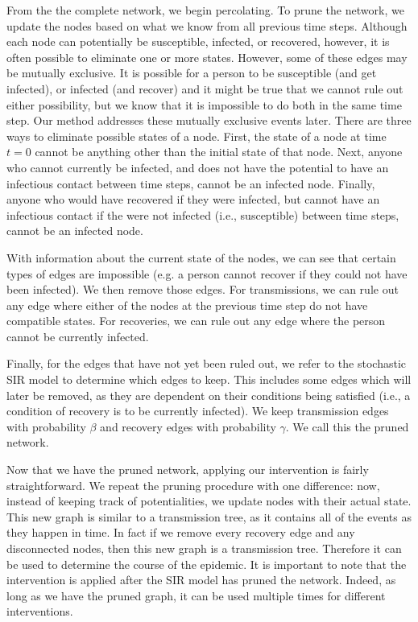 \documentclass[PTRSB]{rsos}
\begin{document}
From the the complete network, we begin percolating. 
To prune the network, we update the nodes based on what we know from all previous time steps.
Although each node can potentially be susceptible, infected, or recovered, however, it is often possible to eliminate one or more states.
However, some of these edges may be mutually exclusive.
It is possible for a person to be susceptible (and get infected), or infected (and recover) and it might be true that we cannot rule out either possibility, but we know that it is impossible to do both in the same time step.
Our method addresses these mutually exclusive events later. %
There are three ways to eliminate possible states of a node.
First, the state of a node at time $t=0$ cannot be anything other than the initial state of that node.
Next, anyone who cannot currently be infected, and does not have the potential to have an infectious contact between time steps, cannot be an infected node.
Finally, anyone who would have recovered if they were infected, but cannot have an infectious contact if the were not infected (i.e., susceptible) between time steps, cannot be an infected node.

With information about the current state of the nodes, we can see that certain types of edges are impossible (e.g. a person cannot recover if they could not have been infected).
We then remove those edges.
For transmissions, we can rule out any edge where either of the nodes at the previous time step do not have compatible states.
For recoveries, we can rule out any edge where the person cannot be currently infected.

Finally, for the edges that have not yet been ruled out, we refer to the stochastic SIR model to determine which edges to keep.
This includes some edges which will later be removed, as they are dependent on their conditions being satisfied (i.e., a condition of recovery is to be currently infected).
We keep transmission edges with probability $\beta$ and recovery edges with probability $\gamma$.
We call this the pruned network.

Now that we have the pruned network, applying our intervention is fairly straightforward.
We repeat the pruning procedure with one difference: now, instead of keeping track of potentialities, we update nodes with their actual state.
This new graph is similar to a transmission tree, as it contains all of the events as they happen in time.
In fact if we remove every recovery edge and any disconnected nodes, then this new graph is a transmission tree.
Therefore it can be used to determine the course of the epidemic.
It is important to note that the intervention is applied after the SIR model has pruned the network.
Indeed, as long as we have the pruned graph, it can be used multiple times for different interventions.
\end{document}
